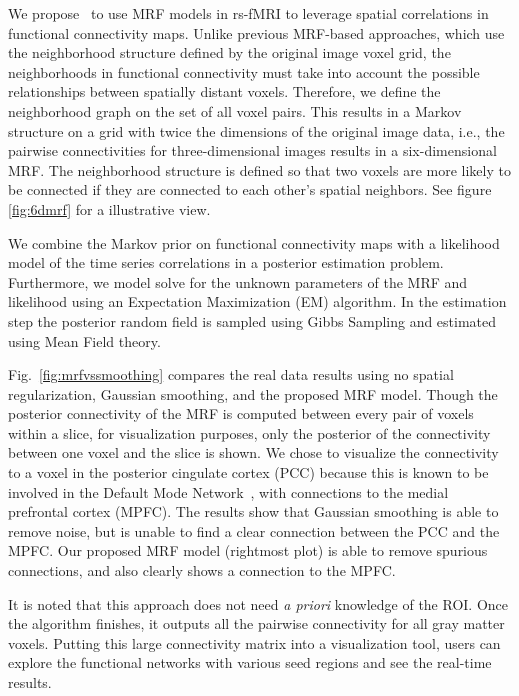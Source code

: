 \documentclass[12pt]{article}
\begin{document}
We propose~\cite{liu2010spatial} to use MRF models in rs-fMRI to leverage spatial
correlations in functional connectivity maps. Unlike previous MRF-based
approaches, which use the neighborhood structure defined by the original image
voxel grid, the neighborhoods in functional connectivity must take into account
the possible relationships between spatially distant voxels. Therefore, we
define the neighborhood graph on the set of all voxel pairs. This results in a
Markov structure on a grid with twice the dimensions of the original image data,
i.e., the pairwise connectivities for three-dimensional images results in a
six-dimensional MRF. The neighborhood structure is defined so that two voxels
are more likely to be connected if they are connected to each other's spatial
neighbors. See figure \ref{fig:6dmrf} for a illustrative view.


We combine the Markov prior on functional connectivity maps with a likelihood
model of the time series correlations in a posterior estimation problem.
Furthermore, we model solve for the unknown parameters of the MRF and likelihood
using an Expectation Maximization (EM) algorithm. In the estimation step the
posterior random field is sampled using Gibbs Sampling and estimated using Mean
Field theory.

Fig.~\ref{fig:mrfvssmoothing} compares the real data results using no spatial
regularization, Gaussian smoothing, and the proposed MRF model. Though the
posterior connectivity of the MRF is computed between every pair of voxels
within a slice, for visualization purposes, only the posterior of the
connectivity between one voxel and the slice is shown. We chose to visualize the
connectivity to a voxel in the posterior cingulate cortex (PCC) because this is
known to be involved in the Default Mode Network~\cite{raichle2001}, with
connections to the medial prefrontal cortex (MPFC). The results show that
Gaussian smoothing is able to remove noise, but is unable to find a clear
connection between the PCC and the MPFC. Our proposed MRF model (rightmost plot)
is able to remove spurious connections, and also clearly shows a connection to
the MPFC.

It is noted that this approach does not need \emph{a priori} knowledge of the
ROI. Once the algorithm finishes, it outputs all the pairwise connectivity for
all gray matter voxels. Putting this large connectivity matrix into a
visualization tool, users can explore the functional networks with various seed
regions and see the real-time results.
\end{document}
